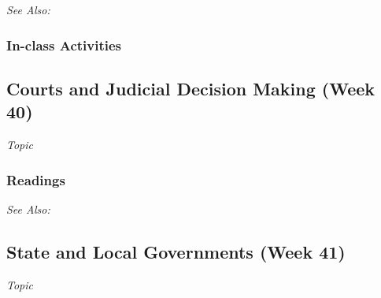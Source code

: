 \documentclass[12pt,a4paper]{article}
\newcommand{\seealso}{\noindent \emph{See Also:}\\}
\begin{document}



\seealso

\subsubsection*{In-class Activities}



\clearpage
\subsection{Courts and Judicial Decision Making (Week 40)}
\emph{Topic}

\vspace{1em}
\subsubsection*{Readings}




\seealso



\clearpage
\subsection{State and Local Governments (Week 41)}
\emph{Topic}
\vspace{1em}
\end{document}
